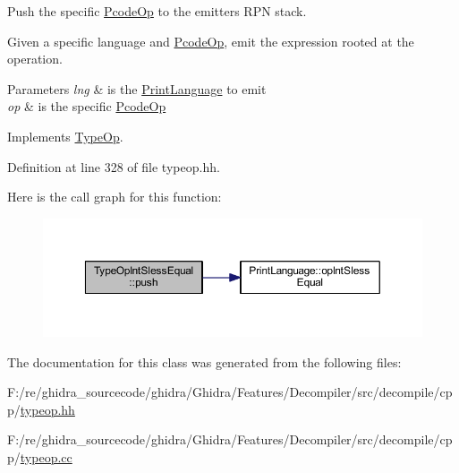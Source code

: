 Push the specific \mbox{\hyperlink{class_pcode_op}{Pcode\+Op}} to the emitter\textquotesingle{}s R\+PN stack. 

Given a specific language and \mbox{\hyperlink{class_pcode_op}{Pcode\+Op}}, emit the expression rooted at the operation. 
\begin{DoxyParams}{Parameters}
{\em lng} & is the \mbox{\hyperlink{class_print_language}{Print\+Language}} to emit \\
\hline
{\em op} & is the specific \mbox{\hyperlink{class_pcode_op}{Pcode\+Op}} \\
\hline
\end{DoxyParams}


Implements \mbox{\hyperlink{class_type_op_ac9c9544203ed74dabe6ac662b653b2af}{Type\+Op}}.



Definition at line 328 of file typeop.\+hh.

Here is the call graph for this function\+:
\nopagebreak
\begin{figure}[H]
\begin{center}
\leavevmode
\includegraphics[width=350pt]{class_type_op_int_sless_equal_a066d484600af10fdbd00a5f114982332_cgraph}
\end{center}
\end{figure}


The documentation for this class was generated from the following files\+:\begin{DoxyCompactItemize}
\item 
F\+:/re/ghidra\+\_\+sourcecode/ghidra/\+Ghidra/\+Features/\+Decompiler/src/decompile/cpp/\mbox{\hyperlink{typeop_8hh}{typeop.\+hh}}\item 
F\+:/re/ghidra\+\_\+sourcecode/ghidra/\+Ghidra/\+Features/\+Decompiler/src/decompile/cpp/\mbox{\hyperlink{typeop_8cc}{typeop.\+cc}}\end{DoxyCompactItemize}
